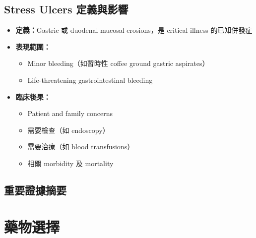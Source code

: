 \documentclass[12pt,a4paper]{article}
\begin{document}
\subsection{Stress Ulcers 定義與影響}

\begin{itemize}
    \item \textbf{定義：}Gastric 或 duodenal mucosal erosions，是 critical illness 的已知併發症
    \item \textbf{表現範圍：}
    \begin{itemize}
        \item Minor bleeding（如暫時性 coffee ground gastric aspirates）
        \item Life-threatening gastrointestinal bleeding
    \end{itemize}
    \item \textbf{臨床後果：}
    \begin{itemize}
        \item Patient and family concerns
        \item 需要檢查（如 endoscopy）
        \item 需要治療（如 blood transfusions）
        \item 相關 morbidity 及 mortality
    \end{itemize}
\end{itemize}

\subsection{重要證據摘要}


\section{藥物選擇}
\end{document}
